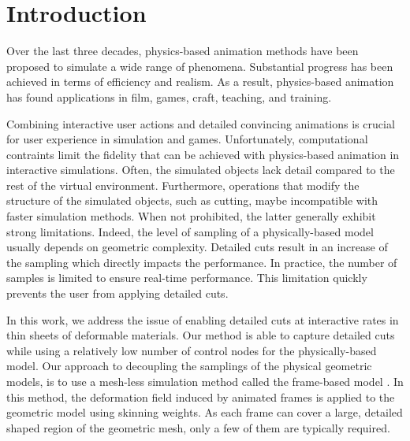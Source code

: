 \documentclass[11pt, oneside, a4paper]{memoir}
\begin{document}
\section{Introduction}

Over the last three decades, physics-based animation methods have been proposed to simulate a wide range of phenomena. Substantial progress has been achieved in terms of efficiency and realism.  
As a result, physics-based animation has found applications in film, games, craft, teaching, and training.

Combining interactive user actions and detailed convincing animations is crucial for user experience in simulation and games. Unfortunately, computational contraints limit the 
fidelity that can be achieved with physics-based animation
in interactive simulations. Often, the simulated objects lack detail compared to the rest of the virtual environment.
Furthermore, operations that modify the structure of the simulated objects, such as cutting, 
maybe incompatible with faster simulation methods.
When not prohibited, the latter generally exhibit strong limitations. Indeed, the level of sampling of a physically-based model usually depends on geometric complexity. Detailed cuts result in an increase of the sampling which directly impacts the performance. In practice, the number of samples is limited to ensure real-time performance. This limitation quickly prevents the user from applying detailed cuts.  

In this work, we address the issue of enabling detailed cuts at interactive rates in  thin sheets of deformable materials. Our method is able to capture detailed cuts while using a relatively low number of control nodes for the physically-based model.
Our approach to decoupling the samplings of the physical geometric models, is to use a mesh-less simulation method called the frame-based model \cite{Gilles2011}. In this method, the deformation field induced by animated frames is applied to the geometric model using skinning weights. As each frame can cover a large, detailed shaped region of the geometric mesh, only a few of them are typically required.
\end{document}
